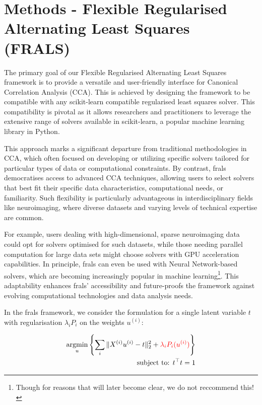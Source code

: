 \section{Methods - Flexible Regularised Alternating Least Squares (FRALS)}\label{subsec:flexible-regularised-alternating-least-squares-(frals)}

The primary goal of our Flexible Regularised Alternating Least Squares framework is to provide a versatile and user-friendly interface for Canonical Correlation Analysis (CCA). This is achieved by designing the framework to be compatible with any scikit-learn compatible regularised least squares solver. This compatibility is pivotal as it allows researchers and practitioners to leverage the extensive range of solvers available in scikit-learn, a popular machine learning library in Python.

This approach marks a significant departure from traditional methodologies in CCA, which often focused on developing or utilizing specific solvers tailored for particular types of data or computational constraints.
By contrast, \acrshort{frals} democratises access to advanced CCA techniques, allowing users to select solvers that best fit their specific data characteristics, computational needs, or familiarity.
Such flexibility is particularly advantageous in interdisciplinary fields like neuroimaging, where diverse datasets and varying levels of technical expertise are common.

For example, users dealing with high-dimensional, sparse neuroimaging data could opt for solvers optimised for such datasets, while those needing parallel computation for large data sets might choose solvers with GPU acceleration capabilities.
In principle, \acrshort{frals} can even be used with Neural Network-based solvers, which are becoming increasingly popular in machine learning\footnote{Though for reasons that will later become clear, we do not reccommend this!}.
This adaptability enhances \acrshort{frals}' accessibility and future-proofs the framework against evolving computational technologies and data analysis needs.

In the \acrshort{frals} framework, we consider the formulation for a single latent variable \(t\) with regularisation \(\lambda_i P_i\) on the weights \(u^{(i)}\):

\begin{align}
    \underset{u}{\mathrm{argmin}}\left\{\sum_i \|X^{(i)} u^{(i)} - t\|_2^2 + \textcolor{red}{\lambda_i P_i(u^{(i)})} \right\}\\
    \text{subject to: }t^\top t = 1 \notag
\end{align}

